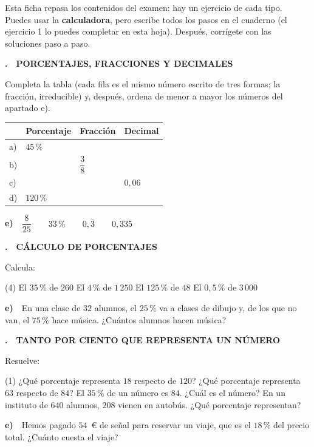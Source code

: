 \documentclass[11pt,a4paper]{article}
\newcounter{exer}
\newcommand{\ex}[2]{\par\needspace{5\baselineskip}\bigskip\stepcounter{exer}\noindent
  {\color{cursfosc}\bfseries\theexer.}\ \ {\scriptsize\bfseries\color{curs}\MakeUppercase{#1}}\par\nopagebreak\smallskip
  \noindent #2\par}
\begin{document}
\thispagestyle{primera}

\vspace{8pt}

\begin{tcolorbox}[colback=soft,colframe=soft,arc=2mm,left=3mm,right=3mm,top=1.5mm,bottom=1.5mm]
\small Esta ficha repasa los contenidos del examen: hay un ejercicio de cada tipo. Puedes usar la \textbf{calculadora}, pero escribe todos los pasos en el cuaderno (el ejercicio 1 lo puedes completar en esta hoja). Después, corrígete con las soluciones paso a paso.
\end{tcolorbox}

\ex{Porcentajes, fracciones y decimales}{Completa la tabla (cada fila es el mismo número escrito de tres formas; la fracción, irreducible) y, después, ordena de menor a mayor los números del apartado e).}
\smallskip
{\renewcommand{\arraystretch}{1.8}\centering
\begin{tabular}{|C{0.6cm}|C{3.6cm}|C{3.6cm}|C{3.6cm}|}
\hline
{} & \textbf{Porcentaje} & \textbf{Fracción} & \textbf{Decimal} \\ \hline
a) & $45\,\%$ & & \\ \hline
b) & & $\dfrac38$ & \\ \hline
c) & & & $0,06$ \\ \hline
d) & $120\,\%$ & & \\ \hline
\end{tabular}\par}

\smallskip
{\color{navy}\bfseries e)}\ \ $\dfrac{8}{25}\qquad 33\,\%\qquad 0,\overline{3}\qquad 0,335$

\ex{Cálculo de porcentajes}{Calcula:}
\begin{tasks}(4)
  \task El $35\,\%$ de $260$
  \task El $4\,\%$ de $1\,250$
  \task El $125\,\%$ de $48$
  \task El $0,5\,\%$ de $3\,000$
\end{tasks}
{\color{navy}\bfseries e)}\ \ En una clase de $32$ alumnos, el $25\,\%$ va a clases de dibujo y, de los que no van, el $75\,\%$ hace música. ¿Cuántos alumnos hacen música?

\ex{Tanto por ciento que representa un número}{Resuelve:}
\begin{tasks}(1)
  \task ¿Qué porcentaje representa $18$ respecto de $120$?
  \task ¿Qué porcentaje representa $63$ respecto de $84$?
  \task El $35\,\%$ de un número es $84$. ¿Cuál es el número?
  \task En un instituto de $640$ alumnos, $208$ vienen en autobús. ¿Qué porcentaje representan?
\end{tasks}
{\color{navy}\bfseries e)}\ \ Hemos pagado $54$~€ de señal para reservar un viaje, que es el $18\,\%$ del precio total. ¿Cuánto cuesta el viaje?
\end{document}
